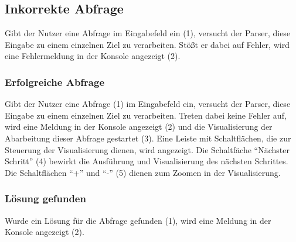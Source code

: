 \documentclass[parskip=full,11pt,twoside]{scrartcl}
\begin{document}
\subsection{Inkorrekte Abfrage}

\begin{minipage}{\linewidth}
\end{minipage}

Gibt der Nutzer eine Abfrage im Eingabefeld ein (1), versucht der Parser, diese Eingabe zu einem einzelnen Ziel zu verarbeiten.
Stößt er dabei auf Fehler, wird eine Fehlermeldung in der Konsole angezeigt (2).

\subsubsection{Erfolgreiche Abfrage}

\begin{minipage}{\linewidth}
\end{minipage}

Gibt der Nutzer eine Abfrage (1) im Eingabefeld ein, versucht der Parser, diese Eingabe zu einem einzelnen Ziel zu verarbeiten.
Treten dabei keine Fehler auf, wird eine Meldung in der Konsole angezeigt (2) und die Visualisierung der Abarbeitung dieser Abfrage gestartet (3).
Eine Leiste mit Schaltflächen, die zur Steuerung der Visualisierung dienen, wird angezeigt.
Die Schaltfäche \enquote{Nächster Schritt} (4) bewirkt die Ausführung und Visualisierung des nächsten Schrittes.
Die Schaltflächen \enquote{+} und \enquote{-} (5) dienen zum Zoomen in der Visualisierung.

\subsubsection{Lösung gefunden}

\begin{minipage}{\linewidth}
\end{minipage}

Wurde ein Lösung für die Abfrage gefunden (1), wird eine Meldung in der Konsole angezeigt (2).
\end{document}
